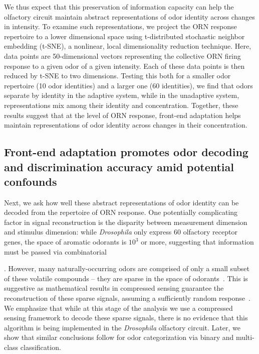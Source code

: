 We thus expect that this preservation of information capacity can help the olfactory circuit maintain  abstract representations of odor identity across changes in intensity. To examine such  representations, we project the ORN  response repertoire to a lower dimensional space using t-distributed stochastic neighbor embedding (t-SNE), a nonlinear, local dimensionality reduction technique. Here, data points are 50-dimensional vectors representing the collective ORN firing response to a given odor of a given intensity. Each of these data points is then reduced by t-SNE to  two dimensions. %
Testing this both for a smaller odor repertoire (10 odor identities) and a larger one (60 identities), we find that odors  separate by identity in the adaptive system, while in the unadaptive system, representations  mix among their identity and concentration. Together, these results suggest that at the level of ORN response, front-end adaptation helps maintain representations of odor identity across changes in their concentration. 




\subsection{Front-end adaptation promotes odor decoding and discrimination accuracy amid potential confounds}

Next, we ask how well these abstract representations of odor identity can be decoded from the repertoire of ORN response.  One potentially complicating factor in signal reconstruction is the disparity between measurement dimension and stimulus dimension: while \textit{Drosophila} only express 60 olfactory receptor genes, the space of aromatic odorants is $10^3$ or more, suggesting that information must be passed via combinatorial 

. However, many naturally-occurring odors are comprised of only a small subset of these volatile compounds -- they are sparse in the space of odorants~\cite{vijay_1}. This is suggestive as mathematical results in compressed sensing guarantee the reconstruction of these sparse signals, assuming a sufficiently random response~\cite{CS_donoho, CS_tao, CS_ganguli}. We emphasize that while at this stage of the analysis we use a compressed sensing framework to decode these sparse signals, there is no evidence that this algorithm is being implemented in the \textit{Drosophila} olfactory circuit. Later, we show that similar conclusions follow for odor categorization via binary and multi-class classification.

